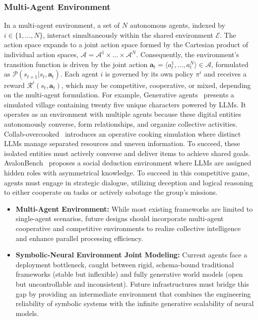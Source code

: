 \subsubsection{Multi-Agent Environment}
In a multi-agent environment, a set of $N$ autonomous agents, indexed by $i \in \{1, \dots, N\}$, interact simultaneously within the shared environment $\mathcal{E}$. The action space expands to a joint action space formed by the Cartesian product of individual action spaces, $\boldsymbol{\mathcal{A}} = \mathcal{A}^1 \times \dots \times \mathcal{A}^N$. Consequently, the environment's transition function is driven by the joint action $\boldsymbol{a}_t = \langle a_t^1, \dots, a_t^N \rangle \in \boldsymbol{\mathcal{A}}$, formulated as $\mathcal{P}(s_{t+1} | s_t, \boldsymbol{a}_t)$. Each agent $i$ is governed by its own policy $\pi^i$ and receives a reward $\mathcal{R}^i(s_t, \boldsymbol{a}_t)$, which may be competitive, cooperative, or mixed, depending on the multi-agent formulation. For example, Generative agents~\cite{Generative-agents} presents a simulated village containing twenty five unique characters powered by LLMs. It operates as an environment with multiple agents because these digital entities autonomously converse, form relationships, and organize collective activities. Collab-overcooked~\cite{Collab-overcooked} introduces an operative cooking simulation where distinct LLMs manage separated resources and uneven information. To succeed, these isolated entities must actively converse and deliver items to achieve shared goals. AvalonBench~\cite{AvalonBench} proposes a social deduction environment where LLMs are assigned hidden roles with asymmetrical knowledge. To succeed in this competitive game, agents must engage in strategic dialogue, utilizing deception and logical reasoning to either cooperate on tasks or actively sabotage the group's missions.





\begin{tcolorbox}[takeaway,title={Takeaway 3}]
\begin{itemize}
    \item \textbf{Multi-Agent Environment:} While most existing frameworks are limited to single-agent scenarios, future designs should incorporate multi-agent cooperative and competitive environments to realize collective intelligence and enhance parallel processing efficiency.
    \item \textbf{Symbolic-Neural Environment Joint Modeling:} Current agents face a deployment bottleneck, caught between rigid, schema-bound traditional frameworks (stable but inflexible) and fully generative world models (open but uncontrollable and inconsistent). Future infrastructures must bridge this gap by providing an intermediate environment that combines the engineering reliability of symbolic systems with the infinite generative scalability of neural models.
\end{itemize}
\end{tcolorbox}